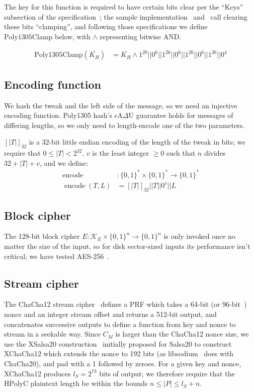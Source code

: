\documentclass[letterpaper,luatex,11pt]{article}
\DeclareMathOperator{\encode}{encode}
\begin{document}
The key for this function is required to have certain bits clear per the ``Keys''
subsection of the specification~\cite{poly1305};
the sample implementation~\cite{poly1305clamp}
and~\cite{RFC7539} call clearing these bits ``clamping'', and following those
specifications we define $\mathrm{Poly1305Clamp}$
below, with $\wedge$ representing bitwise AND.

\begin{align*}
    \mathrm{Poly1305Clamp}(\overline{K_H})
    &= \overline{K_H} \wedge 1^{28} || 0^6 || 1^{26} || 0^6 || 1^{26} || 0^6 || 1^{26} || 0^4
\end{align*}

\subsection{Encoding function}
We hash the tweak and the left side of the message, so we need an injective encoding function.
Poly1305 hash's
$\epsilon$A$\Delta$U guarantee holds for messages of differing lengths, so we only need
to length-encode one of the two parameters.

$[|T|]_{32}$ is a 32-bit little endian encoding of the length of the tweak in bits; we
require that $0 \leq |T| < 2^{32}$.
$v$ is the least integer $\geq 0$ such that $n$ divides $32 + |T| + v$, and we define:
\begin{align*}
\encode &: \{0,1\}^* \times \{0,1\}^* \rightarrow \{0,1\}^* \\
\encode(T, L) &= [|T|]_{32} || T || 0^v || L
\end{align*}

\subsection{Block cipher}
The 128-bit block cipher $E: \mathcal{K}_E \times \{0,1\}^n \rightarrow \{0,1\}^n$
is only invoked once no matter the size of the input, so for disk sector-sized inputs
its performance isn't critical; we have tested AES-256~\cite{AES}.

\subsection{Stream cipher}
The ChaCha12 stream cipher~\cite{chacha}
defines a PRF which takes a 64-bit (or 96-bit~\cite{RFC7539})
nonce and an integer stream offset and returns a 512-bit output, and
concatenates successive outputs to define a function from key and nonce to stream
in a seekable way.
Since $C_M$ is larger than the ChaCha12 nonce size, we use the
XSalsa20 construction~\cite{xsalsa} initially proposed for Salsa20 \cite{salsa20,salsa812}
to construct XChaCha12 which extends the nonce to 192 bits
(as libsodium~\cite{xchacha20}
does with ChaCha20), and pad
with a 1 followed by zeroes. For a
given key and nonce, XChaCha12 produces $l_S = 2^{73}$ bits of output; we
therefore require that the HPolyC plaintext length be within the bounds
$n \leq |P| \leq l_S + n$.
\end{document}
